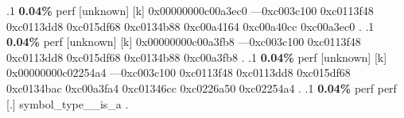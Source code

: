 \begin{profile}
{.1 \textbf{ 0.04\%} perf             [unknown]              [k] 0x00000000c00a3ec0\newline {} ---0xc003c100\newline {} 0xc0113f48\newline {} 0xc0113dd8\newline {} 0xc015df68\newline {} 0xc0134b88\newline {} 0xc00a4164\newline {} 0xc00a40cc\newline {} 0xc00a3ec0\newline {} . 
.1 \textbf{ 0.04\%} perf             [unknown]              [k] 0x00000000c00a3fb8\newline {} ---0xc003c100\newline {} 0xc0113f48\newline {} 0xc0113dd8\newline {} 0xc015df68\newline {} 0xc0134b88\newline {} 0xc00a3fb8\newline {} . 
.1 \textbf{ 0.04\%} perf             [unknown]              [k] 0x00000000c02254a4\newline {} ---0xc003c100\newline {} 0xc0113f48\newline {} 0xc0113dd8\newline {} 0xc015df68\newline {} 0xc0134bac\newline {} 0xc00a3fa4\newline {} 0xc01346cc\newline {} 0xc0226a50\newline {} 0xc02254a4\newline {} . 
.1 \textbf{ 0.04\%} perf             perf                   [.] symbol\_type\_\_is\_a\newline {} . 
}
\end{profile}
